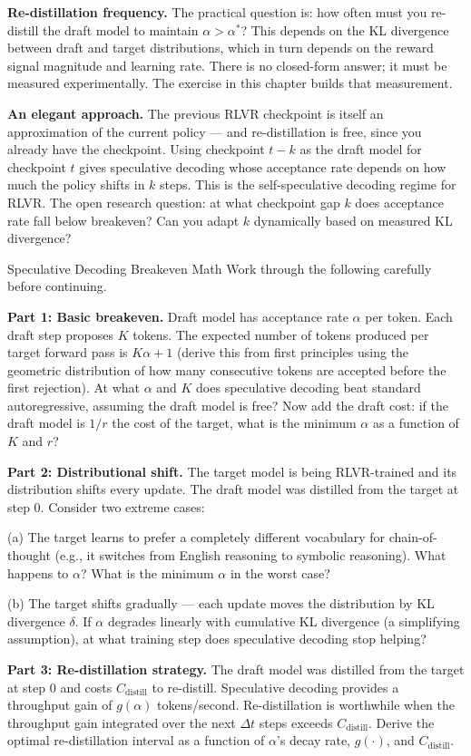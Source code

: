 \textbf{Re-distillation frequency.} The practical question is: how often must you re-distill the draft model to maintain $\alpha > \alpha^*$? This depends on the KL divergence between draft and target distributions, which in turn depends on the reward signal magnitude and learning rate. There is no closed-form answer; it must be measured experimentally. The exercise in this chapter builds that measurement.

\textbf{An elegant approach.} The previous RLVR checkpoint is itself an approximation of the current policy --- and re-distillation is free, since you already have the checkpoint. Using checkpoint $t-k$ as the draft model for checkpoint $t$ gives speculative decoding whose acceptance rate depends on how much the policy shifts in $k$ steps. This is the self-speculative decoding regime for RLVR. The open research question: at what checkpoint gap $k$ does acceptance rate fall below breakeven? Can you adapt $k$ dynamically based on measured KL divergence?

\begin{thinkfirst}{Speculative Decoding Breakeven Math}
Work through the following carefully before continuing.

\textbf{Part 1: Basic breakeven.} Draft model has acceptance rate $\alpha$ per token. Each draft step proposes $K$ tokens. The expected number of tokens produced per target forward pass is $K\alpha + 1$ (derive this from first principles using the geometric distribution of how many consecutive tokens are accepted before the first rejection). At what $\alpha$ and $K$ does speculative decoding beat standard autoregressive, assuming the draft model is free? Now add the draft cost: if the draft model is $1/r$ the cost of the target, what is the minimum $\alpha$ as a function of $K$ and $r$?

\textbf{Part 2: Distributional shift.} The target model is being RLVR-trained and its distribution shifts every update. The draft model was distilled from the target at step 0. Consider two extreme cases:

(a) The target learns to prefer a completely different vocabulary for chain-of-thought (e.g., it switches from English reasoning to symbolic reasoning). What happens to $\alpha$? What is the minimum $\alpha$ in the worst case?

(b) The target shifts gradually --- each update moves the distribution by KL divergence $\delta$. If $\alpha$ degrades linearly with cumulative KL divergence (a simplifying assumption), at what training step does speculative decoding stop helping?

\textbf{Part 3: Re-distillation strategy.} The draft model was distilled from the target at step 0 and costs $C_\text{distill}$ to re-distill. Speculative decoding provides a throughput gain of $g(\alpha)$ tokens/second. Re-distillation is worthwhile when the throughput gain integrated over the next $\Delta t$ steps exceeds $C_\text{distill}$. Derive the optimal re-distillation interval as a function of $\alpha$'s decay rate, $g(\cdot)$, and $C_\text{distill}$.
\end{thinkfirst}

